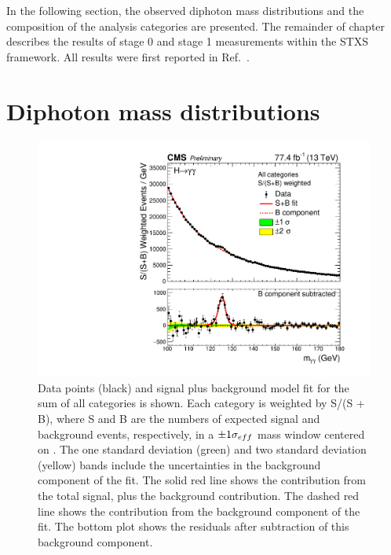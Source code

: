 In the following section, the observed diphoton mass distributions 
and the composition of the analysis categories are presented.
The remainder of chapter describes the results of stage 0 and stage 1 measurements 
within the STXS framework.
All results were first reported in Ref.~\cite{HIG-18-029}.

\section{Diphoton mass distributions}

\begin{figure}[hptb]
\centering
\includegraphics[width=\textwidth]{Figures/Results/MassPlot.pdf}
\caption{
  Data points (black) and signal plus background model fit for the sum of all categories is shown. 
  Each category is weighted by S/(S + B), 
  where S and B are the numbers of expected signal and background events, respectively, 
  in a $\pm 1 \sigma_{eff}$ mass window centered on \mH. 
  The one standard deviation (green) and two standard deviation (yellow) bands 
  include the uncertainties in the background component of the fit. 
  The solid red line shows the contribution from the total signal, plus the background contribution. 
  The dashed red line shows the contribution from the background component of the fit. 
  The bottom plot shows the residuals after subtraction of this background component.
}
\label{fig:results_MassPlot}
\end{figure}


